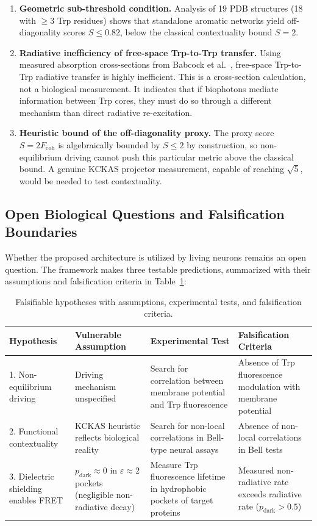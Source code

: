 \documentclass[aps,pre,twocolumn,showpacs,superscriptaddress]{revtex4-2}
\begin{document}
\begin{enumerate}
\item \textbf{Geometric sub-threshold condition.} Analysis of 19 PDB structures (18 with $\geq 3$ Trp residues) shows that standalone aromatic networks yield off-diagonality scores $S \leq 0.82$, below the classical contextuality bound $S = 2$.

\item \textbf{Radiative inefficiency of free-space Trp-to-Trp transfer.} Using measured absorption cross-sections from Babcock et al.~\cite{Babcock2024}, free-space Trp-to-Trp radiative transfer is highly inefficient. This is a cross-section calculation, not a biological measurement. It indicates that if biophotons mediate information between Trp cores, they must do so through a different mechanism than direct radiative re-excitation.

\item \textbf{Heuristic bound of the off-diagonality proxy.} The proxy score $S = 2F_{\mathrm{coh}}$ is algebraically bounded by $S \leq 2$ by construction, so non-equilibrium driving cannot push this particular metric above the classical bound. A genuine KCKAS projector measurement, capable of reaching $\sqrt{5}$, would be needed to test contextuality.
\end{enumerate}

\subsection{Open Biological Questions and Falsification Boundaries}

Whether the proposed architecture is utilized by living neurons remains an open question. The framework makes three testable predictions, summarized with their assumptions and falsification criteria in Table~\ref{tab:falsification}:

\begin{table}[htbp]
\caption{Falsifiable hypotheses with assumptions, experimental tests, and falsification criteria.}
\label{tab:falsification}
\centering
\begin{tabular}{lp{3.0cm}p{3.0cm}p{3.5cm}}
\toprule
Hypothesis & Vulnerable Assumption & Experimental Test & Falsification Criteria \\
\midrule
1. Non-equilibrium driving & Driving mechanism unspecified & Search for correlation between membrane potential and Trp fluorescence & Absence of Trp fluorescence modulation with membrane potential \\
2. Functional contextuality & KCKAS heuristic reflects biological reality & Search for non-local correlations in Bell-type neural assays & Absence of non-local correlations in Bell tests \\
3. Dielectric shielding enables FRET & $p_{\mathrm{dark}} \approx 0$ in $\varepsilon \approx 2$ pockets (negligible non-radiative decay) & Measure Trp fluorescence lifetime in hydrophobic pockets of target proteins & Measured non-radiative rate exceeds radiative rate ($p_{\mathrm{dark}} > 0.5$) \\
\bottomrule
\end{tabular}
\end{table}
\end{document}
